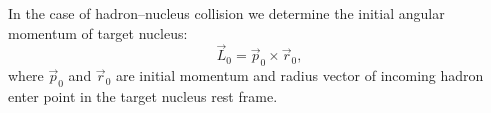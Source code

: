 In the case of hadron--nucleus collision we determine the initial 
angular momentum 
of target nucleus:
\begin{equation}
\label{KNIS19} \vec{L}_0= \vec{p}_0 \times \vec{r}_0,
\end{equation}
where $\vec{p}_0$ and $\vec{r}_0$ are initial momentum and  radius vector 
of incoming hadron enter point in the target nucleus rest frame.
